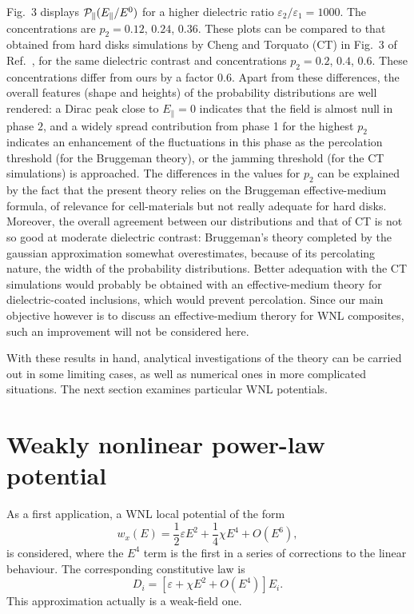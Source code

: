 Fig.\ 3 displays ${\cal{P}}_\parallel(E_\parallel/E^0)$ for a higher
dielectric ratio $\varepsilon_2/\varepsilon_1=1000$.
The concentrations are $p_2=0.12$, $0.24$, $0.36$. These plots
can be compared to that obtained from hard disks simulations by
Cheng and Torquato (CT) in Fig.\ 3 of Ref.\ \cite{CHEN97}, for
the same dielectric contrast and concentrations $p_2=0.2$, $0.4$,
$0.6$. These concentrations differ from ours by a factor $0.6$.
Apart from these differences, the overall features (shape and
heights) of the probability distributions are well rendered:
a Dirac peak close to $E_\parallel=0$ indicates that the field
is almost null in phase $2$, and a widely spread contribution
from phase 1 for the highest $p_2$ indicates an enhancement
of the fluctuations in this phase as the percolation
threshold (for the Bruggeman theory), or the jamming
threshold (for the CT simulations) is approached. The
differences in the values for $p_2$ can be explained by
the fact that the present theory relies on the Bruggeman
effective-medium formula, of relevance for cell-materials
but not really adequate for hard disks. Moreover, the
overall agreement between our distributions and that of
CT is not so good at moderate dielectric contrast: Bruggeman's
theory completed by the gaussian approximation somewhat
overestimates, because of its percolating nature, the width
of the probability distributions. Better adequation with the
CT simulations would probably be obtained with an
effective-medium theory for dielectric-coated inclusions, 
which would prevent percolation. Since our main objective
however is to discuss an effective-medium therory for WNL
composites, such an improvement will not be considered here.

With these results in hand, analytical investigations of the
theory can be carried out in some limiting cases, as well as
numerical ones in more complicated situations. The next
section examines particular WNL potentials.

\section{Weakly nonlinear power-law potential}
\label{wnpp}
As a first application, a WNL local potential of the form
\begin{equation}
w_x(E)=\frac{1}{2}\varepsilon E^2+\frac{1}{4}\chi E^4+O(E^6),
\end{equation}
is considered, where the $E^4$ term is the first in a series of corrections
to the linear behaviour. The corresponding constitutive law is
\begin{equation}
D_i=[\varepsilon+\chi E^2+O(E^4)] E_i.
\end{equation}
This approximation actually is a weak-field one.

